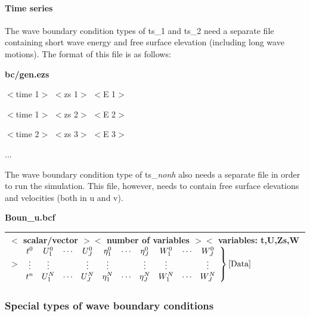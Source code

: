 \documentclass{article}
\begin{document}
\paragraph{ Time series}

\noindent The wave boundary condition types of ts\_1 and ts\_2 need a separate file containing short wave energy and free surface elevation (including long wave motions). The format of this file is as follows:

\noindent 

\noindent \textbf{bc/gen.ezs}

\noindent $<$time 1$>$ $<$zs 1$>$ $<$E 1$>$

\noindent $<$time 1$>$ $<$zs 2$>$ $<$E 2$>$

\noindent $<$time 2$>$ $<$zs 3$>$ $<$E 3$>$

\noindent ...

\noindent The wave boundary condition type of ts\_\textit{nonh} also needs a separate file in order to run the simulation. This file, however, needs to contain free surface elevations and velocities (both in u and v).

\noindent \textbf{Boun\_u.bcf}

\begin{tabular}{|p{4.0in}|} \hline 
$<$ scalar/vector       $>$\newline $<$ number of variables $>$\newline $<$ variables: t,U,Zs,W $>$\newline $\left. \begin{array}{cccccccccc} {t^{0} } & {U_{1}^{0} } & {\cdots } & {U_{J}^{0} } & {\eta _{1}^{0} } & {\cdots } & {\eta _{J}^{0} } & {W_{1}^{0} } & {\cdots } & {W_{J}^{0} } \\ {\vdots } & {\vdots } & {} & {\vdots } & {\vdots } & {} & {\vdots } & {\vdots } & {} & {\vdots } \\ {t^{n} } & {U_{1}^{N} } & {\cdots } & {U_{J}^{N} } & {\eta _{1}^{N} } & {\cdots } & {\eta _{J}^{N} } & {W_{1}^{N} } & {\cdots } & {W_{J}^{N} } \end{array}\right\}{\rm [Data]}$ \\ \hline 
\end{tabular}




\subsubsection{ Special types of wave boundary conditions}
\end{document}
